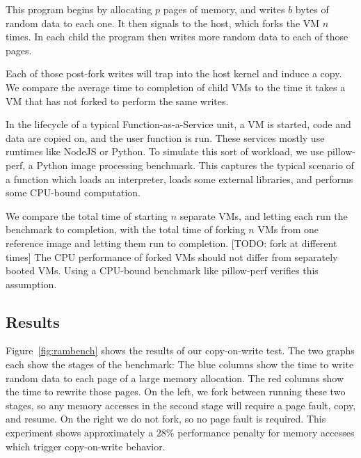 This program begins by allocating $p$ pages of memory, and writes $b$ bytes of random data to each one. It then signals to the host, which forks the VM $n$ times. In each child the program then writes more random data to each of those pages.

Each of those post-fork writes will trap into the host kernel and induce a copy. We compare the average time to completion of child VMs to the time it takes a VM that has not forked to perform the same writes.

 In the lifecycle of a typical Function-as-a-Service unit, a VM is started, code and data are copied on, and the user function is run. These services mostly use runtimes like NodeJS or Python. To simulate this sort of workload, we use pillow-perf, a Python image processing benchmark. This captures the typical scenario of a function which loads an interpreter, loads some external libraries, and performs some CPU-bound computation.

We compare the total time of starting $n$ separate VMs, and letting each run the benchmark to completion, with the total time of forking $n$ VMs from one reference image and letting them run to completion. [TODO: fork at different times] The CPU performance of forked VMs should not differ from separately booted VMs. Using a CPU-bound benchmark like pillow-perf verifies this assumption.

\subsection{Results}


 Figure~\ref{fig:rambench} shows the results of our copy-on-write test. The two graphs each show the stages of the benchmark: The blue columns show the time to write random data to each page of a large memory allocation. The red columns show the time to rewrite those pages. On the left, we fork between running these two stages, so any memory accesses in the second stage will require a page fault, copy, and resume. On the right we do not fork, so no page fault is required. This experiment shows approximately a 28\% performance penalty for memory accesses which trigger copy-on-write behavior.

%
